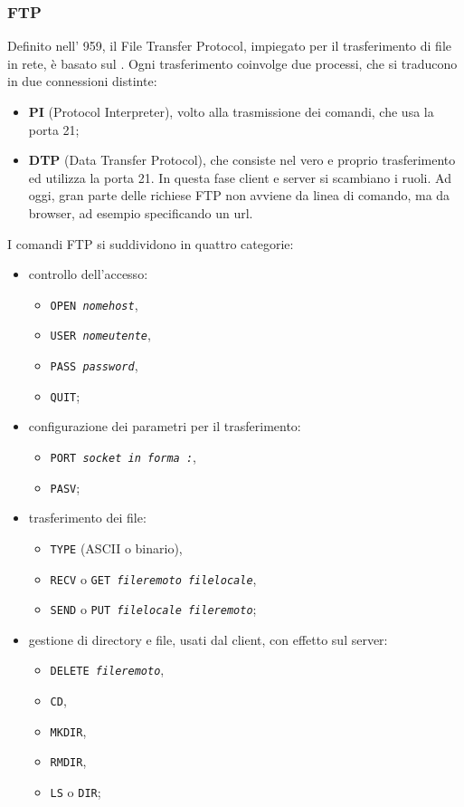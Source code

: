 \documentclass[a4paper, twoside]{article}
\def\code#1{\texttt{#1}}
\def\subsub#1{\subsubsection{#1}\label{#1}}
\def\vedi#1{\nameref{#1}}
\def\italic#1{\textit{#1}}
\begin{document}
\subsub{FTP}
Definito nell'\vedi{RFC} 959, il File Transfer Protocol, impiegato per il trasferimento di file in rete, è basato sul \vedi{TCP}. Ogni trasferimento coinvolge due processi, che si traducono in due connessioni distinte:
\begin{itemize}
\item \textbf{PI} (Protocol Interpreter), volto alla trasmissione dei comandi, che usa la porta 21; 
\item \textbf{DTP} (Data Transfer Protocol), che consiste nel vero e proprio trasferimento ed utilizza la porta 21. In questa fase client e server si scambiano i ruoli. Ad oggi, gran parte delle richiese FTP non avviene da linea di comando, ma da browser, ad esempio specificando un url.
\end{itemize}
I comandi FTP si suddividono in quattro categorie:
\begin{itemize}
\item controllo dell'accesso:
	\begin{itemize}
	\item \code{OPEN \italic{nomehost}},
	\item \code{USER \italic{nomeutente}},
	\item \code{PASS \italic{password}},
	\item \code{QUIT};
	\end{itemize}
\item configurazione dei parametri per il trasferimento:
	\begin{itemize}
	\item \code{PORT \italic{socket in forma \vedi{IP}:\vedi{Porta}}},
	\item \code{PASV};
	\end{itemize}
\item trasferimento dei file:	
	\begin{itemize}
		\item \code{TYPE} (ASCII o binario),
		\item \code{RECV} o \code{GET \italic{fileremoto filelocale}},
		\item \code{SEND} o \code{PUT \italic{filelocale fileremoto}};
	\end{itemize}
\item gestione di directory e file, usati dal client, con effetto sul server:
	\begin{itemize}
		\item \code{DELETE \italic{fileremoto}},
		\item \code{CD},
		\item \code{MKDIR},
		\item \code{RMDIR},
		\item \code{LS} o \code{DIR};
	\end{itemize}
\end{itemize}
\end{document}
